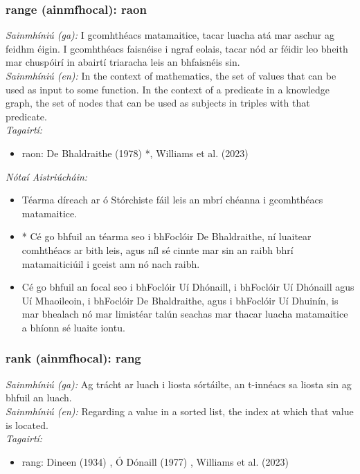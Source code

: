 \subsubsection*{range (ainmfhocal): raon}
 \noindent \textit{Sainmhíniú (ga):} I gcomhthéacs matamaitice, tacar luacha atá mar aschur ag feidhm éigin. I gcomhthéacs faisnéise i ngraf eolais, tacar nód ar féidir leo bheith mar chuspóirí in abairtí triaracha leis an bhfaisnéis sin.
\\
 \noindent \textit{Sainmhíniú (en):} In the context of mathematics, the set of values that can be used as input to some function. In the context of a predicate in a knowledge graph, the set of nodes that can be used as subjects in triples with that predicate.
\\
 \noindent \textit{Tagairtí:}
\begin{itemize}
	\item raon: De Bhaldraithe (1978) \cite{de-bhaldraithe}*, Williams et al. (2023) \cite{storchiste}
\end{itemize}

 \noindent \textit{Nótaí Aistriúcháin:}
\begin{itemize}
	\item Téarma díreach ar ó Stórchiste fáil leis an mbrí chéanna i gcomhthéacs matamaitice.
	\item * Cé go bhfuil an téarma seo i bhFoclóir De Bhaldraithe, ní luaitear comhthéacs ar bith leis, agus níl sé cinnte mar sin an raibh bhrí matamaiticiúil i gceist ann nó nach raibh.
	\item Cé go bhfuil an focal seo i bhFoclóir Uí Dhónaill, i bhFoclóir Uí Dhónaill agus Uí Mhaoileoin, i bhFoclóir De Bhaldraithe, agus i bhFoclóir Uí Dhuinín, is mar bhealach nó mar limistéar talún seachas mar thacar luacha matamaitice a bhíonn sé luaite iontu.
\end{itemize}


\subsubsection*{rank (ainmfhocal): rang}
 \noindent \textit{Sainmhíniú (ga):} Ag trácht ar luach i liosta sórtáilte, an t-innéacs sa liosta sin ag bhfuil an luach.
\\
 \noindent \textit{Sainmhíniú (en):} Regarding a value in a sorted list, the index at which that value is located.
\\
 \noindent \textit{Tagairtí:}
\begin{itemize}
	\item rang: Dineen (1934) \cite{dineen}, Ó Dónaill (1977) \cite{odonaill}, Williams et al. (2023) \cite{storchiste}
\end{itemize}

